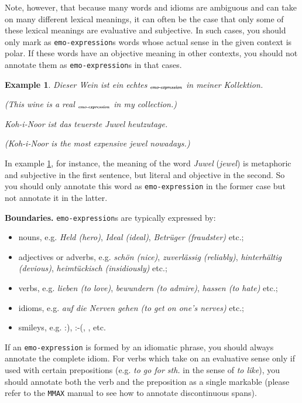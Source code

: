 \documentclass[11pt,a4paper]{article}
\theoremstyle{mytheoremstyle}
\newtheorem{exmp}{Example}[section]
\newcommand{\mtag}[2]{{\upshape[\emph{#2}\upshape]$_{\textrm{\bfseries\emph{\tiny
        #1}}}$}}
\newcommand{\emoexpression}[2][]{\mtag{emo-\-ex\-pression\ifstrempty{#1}{}{:#1}}{#2}}
\begin{document}
Note, however, that because many words and idioms are ambiguous and
can take on many different lexical meanings, it can often be the case
that only some of these lexical meanings are evaluative and
subjective.  In such cases, you should only mark as
\texttt{emo-expression}s words whose actual sense in the given context
is polar.  If these words have an objective meaning in other contexts,
you should not annotate them as \texttt{emo-expression}s in that
cases.
\begin{exmp}
  Dieser Wein ist ein echtes \emoexpression{Juwel} in meiner
  Kollektion.

  (This wine is a real \emoexpression{jewel} in my collection.)

  Koh-i-Noor ist das teuerste Juwel heutzutage.

  (Koh-i-Noor is the most expensive jewel nowadays.)\label{exmp:emo-expression-jewel}
\end{exmp}
\noindent{}In example \ref{exmp:emo-expression-jewel}, for instance,
the meaning of the word \textit{Juwel} (\textit{jewel}) is metaphoric
and subjective in the first sentence, but literal and objective in the
second.  So you should only annotate this word as
\texttt{emo-expression} in the former case but not annotate it in the
latter.

\noindent\textbf{Boundaries.} \texttt{emo-expression}s are typically
expressed by:
\begin{itemize}
  \item nouns, e.g. \textit{Held (hero)}, \textit{Ideal (ideal)},
    \textit{Betr\"uger (fraudster)} etc.;

  \item adjectives or adverbs, e.g. \textit{sch\"on (nice)},
    \textit{zuverl\"assig (reliably)}, \textit{hinterh\"altig
      (devious)}, \textit{heimt\"uckisch (insidiously)} etc.;

  \item verbs, e.g. \textit{lieben (to love)}, \textit{bewundern (to
    admire)}, \textit{hassen (to hate)} etc.;

  \item idioms, e.g. \textit{auf die Nerven gehen (to get on one's
    nerves)} etc.;

  \item smileys, e.g. :), :-(, \smiley{}, \frownie{} etc.
\end{itemize}
If an \texttt{emo-expression} is formed by an idiomatic phrase, you should
always annotate the complete idiom.  For verbs which take on an evaluative
sense only if used with certain prepositions (e.g. \textit{to go for sth.} in
the sense of \textit{to like}), you should annotate both the verb and the
preposition as a single markable (please refer to the \texttt{MMAX} manual to
see how to annotate discontinuous spans).
\end{document}
